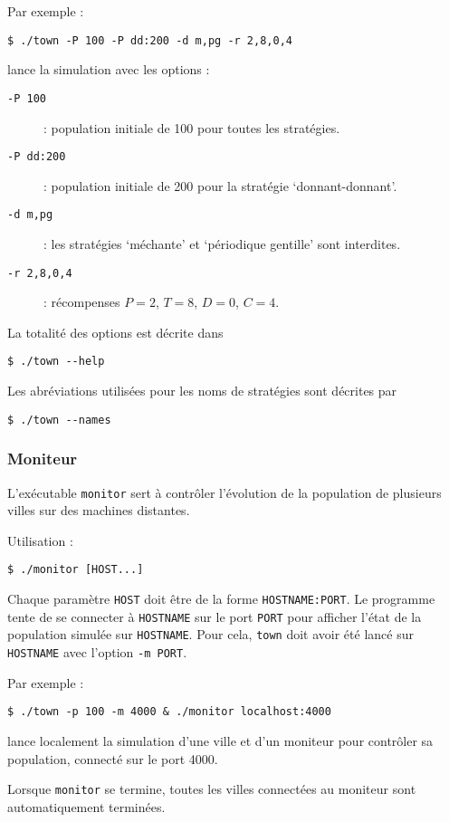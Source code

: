 \documentclass[draft,10pt]{article}
\begin{document}
Par exemple :
\begin{verbatim}
$ ./town -P 100 -P dd:200 -d m,pg -r 2,8,0,4
\end{verbatim}
lance la simulation avec les options :
\begin{description}
\item[\tt{-P 100}] : population initiale de 100 pour toutes les stratégies.
\item[\tt{-P dd:200}] : population initiale de 200 pour la stratégie `donnant-donnant'.
\item[\tt{-d m,pg}] : les stratégies `méchante' et `périodique gentille' sont interdites.
\item[\tt{-r 2,8,0,4}] : récompenses $P=2$, $T=8$, $D=0$, $C=4$.
\end{description}

La totalité des options est décrite dans
\begin{verbatim}
$ ./town --help
\end{verbatim}

Les abréviations utilisées pour les noms de stratégies sont décrites par
\begin{verbatim}
$ ./town --names
\end{verbatim}

\subsubsection{Moniteur}
L'exécutable \verb|monitor| sert à contrôler l'évolution de la population de plusieurs villes sur des machines distantes.

Utilisation :
\begin{verbatim}
$ ./monitor [HOST...]
\end{verbatim}
Chaque paramètre \verb|HOST| doit être de la forme \verb|HOSTNAME:PORT|.
Le programme tente de se connecter à \verb|HOSTNAME| sur le port \verb|PORT| pour afficher l'état de la population simulée sur \verb|HOSTNAME|.
Pour cela, \verb|town| doit avoir été lancé sur \verb|HOSTNAME| avec l'option \verb|-m PORT|.

Par exemple :
\begin{verbatim}
$ ./town -p 100 -m 4000 & ./monitor localhost:4000
\end{verbatim}
lance localement la simulation d'une ville et d'un moniteur pour contrôler sa population, connecté sur le port 4000.

Lorsque \verb|monitor| se termine, toutes les villes connectées au moniteur sont automatiquement terminées.
\end{document}
